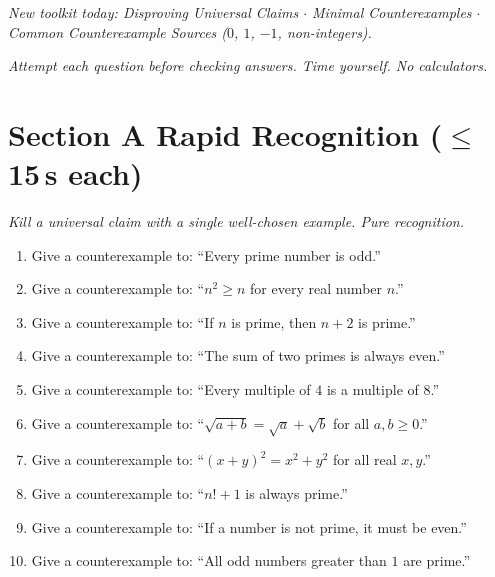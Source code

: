 \documentclass[11pt,a4paper]{article}
\begin{document}
\noindent\textit{New toolkit today: Disproving Universal Claims $\cdot$ Minimal Counterexamples $\cdot$ Common Counterexample Sources ($0$, $1$, $-1$, non-integers).}

\vspace{2pt}
\noindent\textit{Attempt each question before checking answers. Time yourself. No calculators.}

\section*{Section A \quad Rapid Recognition \hfill{\normalfont\small($\leq$15\,s each)}}

\noindent\textit{Kill a universal claim with a single well-chosen example. Pure recognition.}

\begin{enumerate}

\item Give a counterexample to: ``Every prime number is odd.''

\item Give a counterexample to: ``$n^2 \geq n$ for every real number $n$.''

\item Give a counterexample to: ``If $n$ is prime, then $n+2$ is prime.''

\item Give a counterexample to: ``The sum of two primes is always even.''

\item Give a counterexample to: ``Every multiple of $4$ is a multiple of $8$.''

\item Give a counterexample to: ``$\sqrt{a+b} = \sqrt{a}+\sqrt{b}$ for all $a,b \geq 0$.''

\item Give a counterexample to: ``$(x+y)^2 = x^2+y^2$ for all real $x,y$.''

\item Give a counterexample to: ``$n!+1$ is always prime.''

\item Give a counterexample to: ``If a number is not prime, it must be even.''

\item Give a counterexample to: ``All odd numbers greater than $1$ are prime.''

\end{enumerate}
\end{document}
